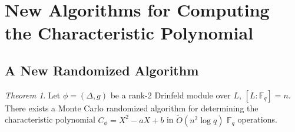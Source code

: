 \documentclass{acmart}
\theoremstyle{remark}
\numberwithin{equation}{section}
\newtheorem{theorem}{Theorem}
\begin{document}
\section{New Algorithms for Computing the Characteristic Polynomial}






\subsection{A New Randomized Algorithm}

\begin{theorem}
Let $\phi = (\Delta, g)$ be a rank-2 Drinfeld module over $L$, $[L: \mathbb{F}_q] = n$. There exists a Monte Carlo randomized algorithm for determining the characteristic polynomial $C_{\phi} = X^2 -aX + b$ in $\widetilde{O}(n^2 \log q)$ $\mathbb{F}_q$ operations.
\end{theorem}
\end{document}
